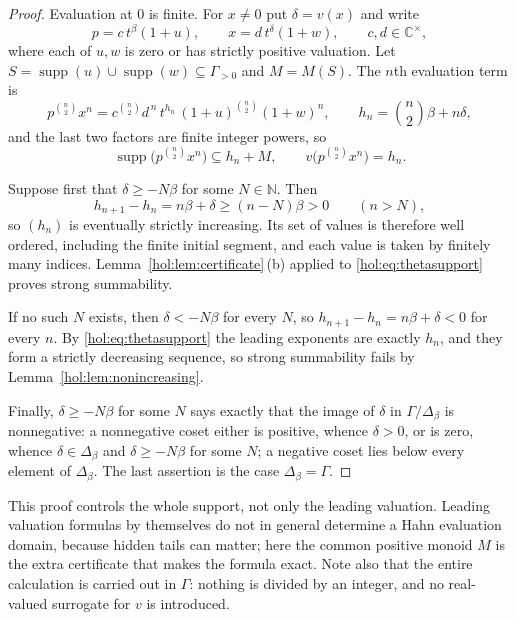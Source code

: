 \documentclass[11pt]{article}
\numberwithin{equation}{section}
\theoremstyle{definition}
\theoremstyle{remark}
\newcommand{\C}{\mathbb C}
\newcommand{\N}{\mathbb N}
\newcommand{\supp}{\operatorname{supp}}
\begin{document}
\begin{proof}
Evaluation at $0$ is finite. For $x\ne0$ put $\delta=v(x)$ and write
\[
 p=c\,t^\beta(1+u),\qquad x=d\,t^\delta(1+w),\qquad c,d\in\C^\times,
\]
where each of $u,w$ is zero or has strictly positive valuation. Let
$S=\supp(u)\cup\supp(w)\subseteq\Gamma_{>0}$ and $M=M(S)$. The $n$th
evaluation term is
\[
 p^{\binom n2}x^n
 =c^{\binom n2}d^{\,n}\,t^{h_n}\,(1+u)^{\binom n2}(1+w)^n,
 \qquad h_n=\binom n2\beta+n\delta,
\]
and the last two factors are finite integer powers, so
\begin{equation}\label{hol:eq:thetasupport}
 \supp\bigl(p^{\binom n2}x^n\bigr)\subseteq h_n+M,
 \qquad v\bigl(p^{\binom n2}x^n\bigr)=h_n.
\end{equation}

Suppose first that $\delta\ge-N\beta$ for some $N\in\N$. Then
\[
 h_{n+1}-h_n=n\beta+\delta\ge(n-N)\beta>0\qquad(n>N),
\]
so $(h_n)$ is eventually strictly increasing. Its set of values is therefore
well ordered, including the finite initial segment, and each value is taken by
finitely many indices. Lemma~\ref{hol:lem:certificate}\,(b) applied to
\eqref{hol:eq:thetasupport} proves strong summability.

If no such $N$ exists, then $\delta<-N\beta$ for every $N$, so
$h_{n+1}-h_n=n\beta+\delta<0$ for every $n$. By
\eqref{hol:eq:thetasupport} the leading exponents are exactly $h_n$, and they
form a strictly decreasing sequence, so strong summability fails by
Lemma~\ref{hol:lem:nonincreasing}.

Finally, $\delta\ge-N\beta$ for some $N$ says exactly that the image of
$\delta$ in $\Gamma/\Delta_\beta$ is nonnegative: a nonnegative coset either
is positive, whence $\delta>0$, or is zero, whence $\delta\in\Delta_\beta$ and
$\delta\ge-N\beta$ for some $N$; a negative coset lies below every element of
$\Delta_\beta$. The last assertion is the case $\Delta_\beta=\Gamma$.
\end{proof}

This proof controls the whole support, not only the leading valuation. Leading
valuation formulas by themselves do not in general determine a Hahn evaluation
domain, because hidden tails can matter; here the common positive monoid $M$
is the extra certificate that makes the formula exact. Note also that the
entire calculation is carried out in $\Gamma$: nothing is divided by an
integer, and no real-valued surrogate for $v$ is introduced.
\end{document}
